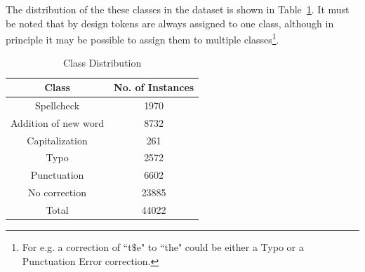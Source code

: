 \documentclass[letterpaper]{article}
\begin{document}
\begin{enumerate}
\begin{itemize}
The distribution of the these classes in the dataset is shown in Table~\ref{table: classes}. It must be noted that by design tokens are always assigned to one class, although in principle it may be possible to assign them to multiple classes\footnote{For e.g. a correction of ``t$\$$e" to ``the" could be either a Typo or a Punctuation Error correction.}.

\begin{table}[htdp]
\begin{center}
\begin{tabular}{| c | c |}
\hline
 Class  & No. of Instances \\
\hline
 Spellcheck & 1970 \\
 Addition of new word & 8732 \\
 Capitalization & 261 \\
Typo & 2572 \\
Punctuation & 6602 \\
No correction & 23885 \\
\hline
Total & 44022 \\
\hline
\end{tabular}
\end{center}
\caption{Class Distribution}
\label{table: classes}
\end{table}

\end{itemize}






%



\end{enumerate}
\end{document}
